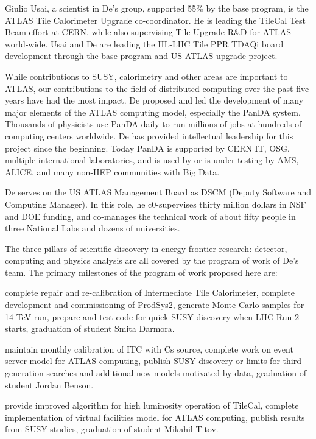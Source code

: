 Giulio Usai, a scientist in De's group, supported 55\% by the base program, is the ATLAS Tile Calorimeter Upgrade co-coordinator. He is leading the TileCal Test Beam effort at CERN, while also supervising Tile Upgrade R\&D for ATLAS world-wide. Usai and De are leading the HL-LHC Tile PPR TDAQi board development through the base program and US ATLAS upgrade project.

While contributions to SUSY, calorimetry and other areas are important to ATLAS, our contributions to the field of distributed computing over the past five years have had the most impact. De proposed and led the development of many major elements of the ATLAS computing model, especially the PanDA system. Thousands of physicists use PanDA daily to run millions of jobs at hundreds of computing centers worldwide. De has provided intellectual leadership for this project since the beginning. Today PanDA is supported by CERN IT, OSG, multiple international laboratories, and is used by or is under testing by AMS, ALICE, and many non-HEP communities with Big Data. 

De serves on the US ATLAS Management Board as DSCM (Deputy Software and Computing Manager). In this role, he c0-supervises thirty million dollars in NSF and DOE funding, and co-manages the technical work of about fifty people in three National Labs and dozens of universities.

The three pillars of scientific discovery in energy frontier research: detector, computing and physics analysis are all covered by the program of work of De's team. The primary milestones of the program of work proposed here are:
\begin{description}
\item[2017] complete repair and re-calibration of Intermediate Tile Calorimeter, complete development and commissioning of ProdSys2, generate Monte Carlo samples for 14 TeV run, prepare and test code for quick SUSY discovery when LHC Run 2 starts, graduation of student Smita Darmora.
\item[2018] maintain monthly calibration of ITC with Cs source, complete work on event server model for ATLAS computing, publish SUSY discovery or limits for third generation searches and additional new models motivated by data, graduation of student Jordan Benson.
\item[2019] provide improved algorithm for high luminosity operation of TileCal, complete implementation of virtual facilities model for ATLAS computing, publish results from SUSY studies, graduation of student Mikahil Titov.
\end{description}

